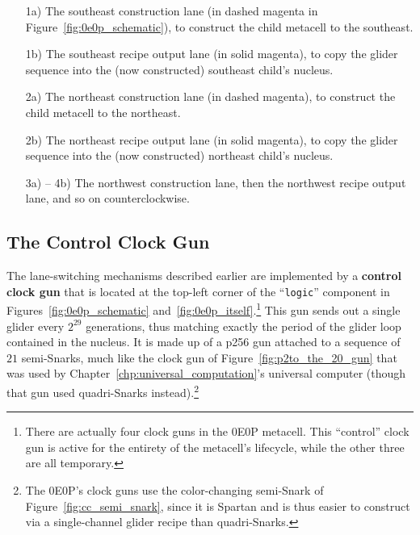 \begin{itemize}
	\item[1a)] The southeast construction lane (in dashed magenta in Figure~\ref{fig:0e0p_schematic}), to construct the child metacell to the southeast.\smallskip
	
	\item[1b)] The southeast recipe output lane (in solid magenta), to copy the glider sequence into the (now constructed) southeast child's nucleus.\smallskip
	
	\item[2a)] The northeast construction lane (in dashed magenta), to construct the child metacell to the northeast.\smallskip
	
	\item[2b)] The northeast recipe output lane (in solid magenta), to copy the glider sequence into the (now constructed) northeast child's nucleus.\smallskip
	
	\item[3a) -- 4b)] The northwest construction lane, then the northwest recipe output lane, and so on counterclockwise.
\end{itemize}


\subsection{The Control Clock Gun}\label{sec:0e0p_structure_clock}

The lane-switching mechanisms described earlier are implemented by a \textbf{control clock gun} that is located at the top-left corner of the ``\texttt{logic}'' component in Figures~\ref{fig:0e0p_schematic} and~\ref{fig:0e0p_itself}.\footnote{There are actually four clock guns in the 0E0P metacell. This ``control'' clock gun is active for the entirety of the metacell's lifecycle, while the other three are all temporary.} This gun sends out a single glider every $2^{29}$ generations, thus matching exactly the period of the glider loop contained in the nucleus. It is made up of a p256 gun attached to a sequence of $21$ semi-Snarks, much like the clock gun of Figure~\ref{fig:p2to_the_20_gun} that was used by Chapter~\ref{chp:universal_computation}'s universal computer (though that gun used quadri-Snarks instead).\footnote{The 0E0P's clock guns use the color-changing semi-Snark of Figure~\ref{fig:cc_semi_snark}, since it is Spartan and is thus easier to construct via a single-channel glider recipe than quadri-Snarks.}


